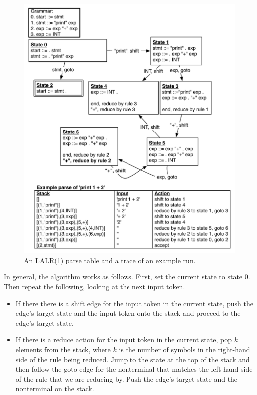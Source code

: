 \documentclass[7x10]{TimesAPriori_MIT}%
\numberwithin{theorem}{chapter}
\numberwithin{definition}{chapter}
\numberwithin{equation}{chapter}
\begin{document}
{\begin{figure}[tbp]
  \centering
\includegraphics[width=5.0in]{figs/shift-reduce-conflict}  
  \caption{An LALR(1) parse table and a trace of an example run.}
  \label{fig:shift-reduce}
\end{figure}

In general, the algorithm works as follows. First, set the current state to
state $0$. Then repeat the following, looking at the next input token.
\begin{itemize}
\item If there there is a shift edge for the input token in the
  current state, push the edge's target state and the input token onto
  the stack and proceed to the edge's target state.
\item If there is a reduce action for the input token in the current
  state, pop $k$ elements from the stack, where $k$ is the number of
  symbols in the right-hand side of the rule being reduced. Jump to
  the state at the top of the stack and then follow the goto edge for
  the nonterminal that matches the left-hand side of the rule that we
  are reducing by. Push the edge's target state and the nonterminal on the
  stack.
\end{itemize}

}
\end{document}
